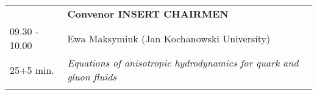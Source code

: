 \begin{longtable}{p{3cm}p{13cm}}
&\hfill {\bf Convenor INSERT CHAIRMEN }\\ 
09.30 - 10.00 & Ewa Maksymiuk (Jan Kochanowski University)\\ 
25+5 min. & {\it Equations of anisotropic hydrodynamics for quark and gluon fluids}\\ 
 & \\ 
\end{longtable}


